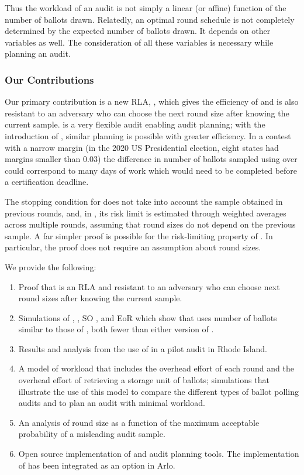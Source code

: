 Thus the workload of an audit is not simply a linear (or affine) function of the number of ballots drawn. Relatedly, an optimal round schedule is not completely determined by the expected number of ballots drawn. It depends on other variables as well. The consideration of all these variables is necessary while planning an audit. 

\subsubsection{Our Contributions}
Our primary contribution is a new RLA, \Providence, which gives the efficiency of \Minerva and is also resistant to an adversary who can choose the next round size after knowing the current sample. 
\BRAVO is a very flexible audit enabling audit planning; with the introduction of \Providence, similar planning is possible with greater efficiency. In a contest with a narrow margin (in the 2020 US Presidential election, eight states had margins smaller than 0.03) the difference in number of ballots sampled using \Providence over \BRAVO could correspond to many days of work which would need to be completed before a certification deadline.

The stopping condition for \Minerva does not take into account the sample obtained in previous rounds, and, in \cite{usenix_minerva}, its risk limit is estimated through weighted averages across multiple rounds, assuming that round sizes do not depend on the previous sample. 
A far simpler proof is possible for the risk-limiting property of \Providence. 
In particular, the proof does not require an assumption about round sizes. 

We provide the following:
\begin{enumerate}
\item Proof that \Providence is an RLA and resistant to an adversary who can choose next round sizes after knowing the current sample.
\item Simulations of \Providence, \Minerva, SO \BRAVO, and EoR \BRAVO which show that \Providence uses number of ballots similar to those of \Minerva, both fewer than either version of \BRAVO.
\item Results and analysis from the use of \Providence in a pilot audit in Rhode Island.
\item A model of workload that includes the overhead effort of each round and the overhead effort of retrieving a storage unit of ballots; simulations that illustrate the use of this model to compare the different types of ballot polling audits and to plan an audit with minimal workload.
\item An analysis of round size as a function of the maximum acceptable probability of a misleading audit sample.
\item Open source implementation of \Providence and audit planning tools. The implementation of \Providence has been integrated as an option in Arlo. 
\end{enumerate}

